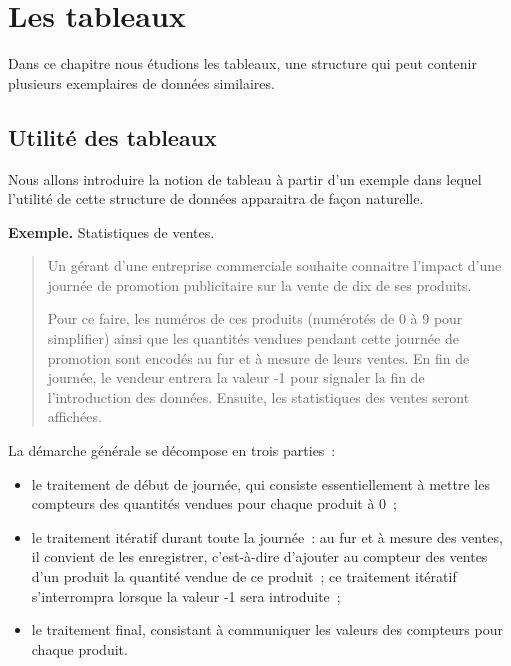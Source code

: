 \chapter{Les tableaux}

	Dans ce chapitre nous étudions les tableaux, une structure qui peut contenir
	plusieurs exemplaires de données similaires.

	\minitoc
	\clearpage
	\section{Utilité des tableaux}
	
		Nous allons introduire la notion de tableau à partir d’un exemple 
		dans lequel l’utilité de cette structure de données 
		apparaitra de façon naturelle.
	
		\textbf{Exemple.}
		Statistiques de ventes.
		\begin{quote}	
		
			Un gérant d’une entreprise commerciale souhaite connaitre l’impact
			d’une journée de promotion publicitaire sur la vente de dix de ses
			produits.  
			
			Pour ce faire, les numéros de ces produits (numérotés de
			0 à 9 pour simplifier) ainsi que les quantités vendues pendant cette
			journée de promotion sont encodés au fur et à mesure de leurs
			ventes.  En fin de journée, le vendeur entrera la valeur -1 pour
			signaler la fin de l’introduction des données.  Ensuite, les
			statistiques des ventes seront affichées.
		
		\end{quote}

		La démarche générale se décompose en trois parties~:
		\begin{itemize}
		
			\item le traitement de début de journée, qui consiste
				essentiellement à mettre les compteurs des quantités vendues
				pour chaque produit à 0~;
		
			\item le traitement itératif durant toute la journée~: au fur et
				à mesure des ventes, il convient de les enregistrer,
				c’est-à-dire d’ajouter au compteur des ventes d’un produit la
				quantité vendue de ce produit~; ce traitement itératif
				s’interrompra lorsque la valeur -1 sera introduite~;
		
			\item le traitement final, consistant à communiquer les valeurs des
				compteurs pour chaque produit.
		
	\end{itemize}
	
